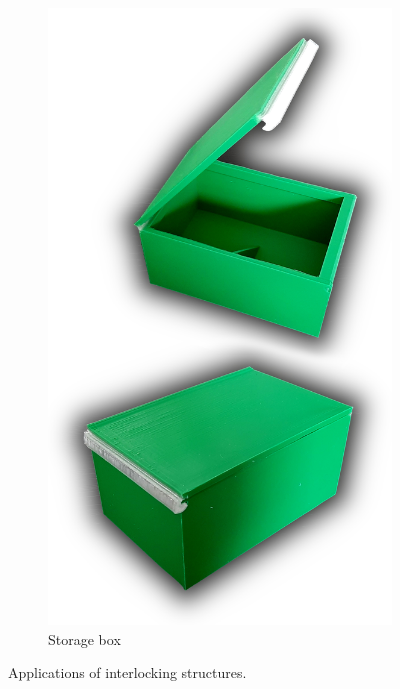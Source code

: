 \begin{figure}
\begin{subfigure}[B]{.3\columnwidth}
		\includegraphics[height=\figheight]{sources/applications/storage_box.jpg}
		\caption{Storage box}
	\end{subfigure}
	\caption{Applications of interlocking structures.}
	\label{fig:applications}
\end{figure}




